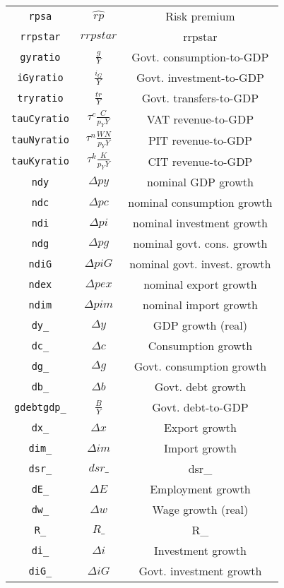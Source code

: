 \begin{center}
\begin{longtable}{ccc}
\texttt{rpsa} & $\hat{rp}$ & Risk premium\\
\texttt{rrpstar} & $rrpstar$ & rrpstar\\
\texttt{gyratio} & $\frac{g}{Y}$ & Govt. consumption-to-GDP\\
\texttt{iGyratio} & $\frac{{i}_G}{Y}$ & Govt. investment-to-GDP\\
\texttt{tryratio} & $\frac{tr}{Y}$ & Govt. transfers-to-GDP\\
\texttt{tauCyratio} & ${{\tau}^{c}}\frac{C}{{p_{Y}}Y}$ & VAT revenue-to-GDP\\
\texttt{tauNyratio} & ${{\tau}^{n}}\frac{WN}{{p_{Y}}Y}$ & PIT revenue-to-GDP\\
\texttt{tauKyratio} & ${{\tau}^{k}}\frac{K}{{p_{Y}}Y}$ & CIT revenue-to-GDP\\
\texttt{ndy} & $\Delta{py}$ & nominal GDP growth\\
\texttt{ndc} & $\Delta{pc}$ & nominal consumption growth\\
\texttt{ndi} & $\Delta{pi}$ & nominal investment growth\\
\texttt{ndg} & $\Delta{pg}$ & nominal govt. cons. growth\\
\texttt{ndiG} & $\Delta{piG}$ & nominal govt. invest. growth\\
\texttt{ndex} & $\Delta{pex}$ & nominal export growth\\
\texttt{ndim} & $\Delta{pim}$ & nominal import growth\\
\texttt{dy\_} & $\Delta{y}$ & GDP growth (real)\\
\texttt{dc\_} & $\Delta{c}$ & Consumption growth\\
\texttt{dg\_} & $\Delta{g}$ & Govt. consumption growth\\
\texttt{db\_} & $\Delta{b}$ & Govt. debt growth\\
\texttt{gdebtgdp\_} & $\frac{B}{Y}$ & Govt. debt-to-GDP\\
\texttt{dx\_} & $\Delta{x}$ & Export growth\\
\texttt{dim\_} & $\Delta{im}$ & Import growth\\
\texttt{dsr\_} & $dsr\_$ & dsr\_\\
\texttt{dE\_} & $\Delta{E}$ & Employment growth\\
\texttt{dw\_} & $\Delta{w}$ & Wage growth (real)\\
\texttt{R\_} & $R\_$ & R\_\\
\texttt{di\_} & $\Delta{i}$ & Investment growth\\
\texttt{diG\_} & $\Delta{iG}$ & Govt. investment growth\\

\end{longtable}
\end{center}

